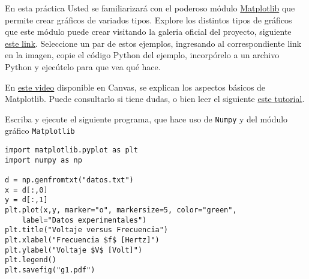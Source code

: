 \documentclass[11pt]{exam}
\begin{document}
\firstpageheadrule
\runningheadrule
{}
\cfoot{ }
\begin{flushleft}
\vspace{0.2in}

\vspace{0.25cm}
\end{flushleft}

\begin{questions}

\item En esta práctica Usted se familiarizará con el poderoso módulo \href{https://matplotlib.org/}{Matplotlib} que permite crear gráficos de variados tipos. Explore los distintos tipos de gráficos que este módulo puede crear visitando la galeria oficial del proyecto, siguiente \href{https://matplotlib.org/stable/gallery/index}{este link}. Seleccione un par de estos ejemplos, ingresando al correspondiente link en la imagen, copie el código Python del ejemplo, incorpórelo a un archivo Python y ejecútelo para que vea qué hace.

\item En \href{https://udec.instructure.com/courses/51022/pages/matplotlib?module_item_id=1904643}{este video} disponible en Canvas, se explican los aspectos básicos de Matplotlib. Puede consultarlo si tiene dudas, o bien leer el siguiente \href{https://github.com/PythonUdeC/CPC21/blob/main/04-Matplotlib.ipynb}{este tutorial}. 

\item Escriba y ejecute el siguiente programa, que hace uso de \texttt{Numpy} y del módulo gráfico \texttt{Matplotlib}

\begin{verbatim}
import matplotlib.pyplot as plt
import numpy as np

d = np.genfromtxt("datos.txt")
x = d[:,0]
y = d[:,1]
plt.plot(x,y, marker="o", markersize=5, color="green", 
	label="Datos experimentales")
plt.title("Voltaje versus Frecuencia")
plt.xlabel("Frecuencia $f$ [Hertz]")
plt.ylabel("Voltaje $V$ [Volt]")
plt.legend()
plt.savefig("g1.pdf")
\end{verbatim}


\end{questions}
\end{document}
